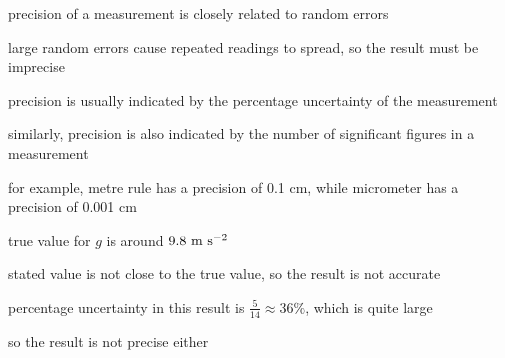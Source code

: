 \cmt precision of a measurement is closely related to random errors

large random errors cause repeated readings to spread, so the result must be imprecise

\cmt precision is usually indicated by the percentage uncertainty of the measurement

similarly, precision is also indicated by the number of significant figures in a measurement

for example, metre rule has a precision of 0.1 cm, while micrometer has a precision of 0.001 cm



\sol true value for $g$ is around $9.8\text{ m s$^{-2}$}$

stated value is not close to the true value, so the result is not accurate

percentage uncertainty in this result is $\frac{5}{14}\approx 36\%$, which is quite large

so the result is not precise either \eoe



